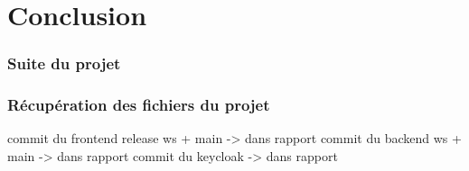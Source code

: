 \documentclass[
    iai, %
    il, %
]{heig-tb}
\begin{document}






\chapter{Conclusion}



\subsection{Suite du projet}

\subsection{Récupération des fichiers du projet}
commit du frontend release ws + main -> dans rapport %
commit du backend ws + main -> dans rapport %
commit du keycloak -> dans rapport %
\end{document}
